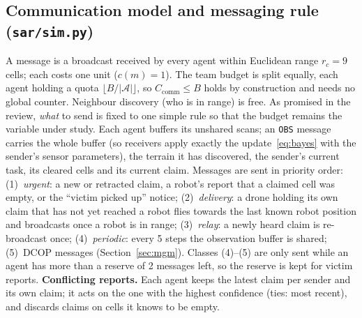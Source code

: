 \documentclass{article}
\newcommand{\A}{\mathscr{A}}
\begin{document}
\subsection{Communication model and messaging rule (\texttt{sar/sim.py})}
A message is a broadcast received by every agent within Euclidean range $r_c=9$ cells; each costs one unit
($c(m)=1$). The team budget is split equally, each agent holding a quota $\lfloor B/|\A|\rfloor$, so
$C_{\mathrm{comm}}\le B$ holds by construction and needs no global counter. Neighbour discovery (who is in range) is free.
As promised in the review, \emph{what} to send is fixed to one simple rule so that the budget remains the variable
under study. Each agent buffers its unshared scans; an \texttt{OBS} message carries the whole buffer (so receivers apply
exactly the update~\eqref{eq:bayes} with the sender's sensor parameters), the terrain it has discovered, the sender's
current task, its cleared cells and its current claim. Messages are sent in priority order: (1)~\emph{urgent}: a new or retracted claim, a robot's
report that a claimed cell was empty, or the ``victim picked up'' notice; (2)~\emph{delivery}: a drone holding its own
claim that has not yet reached a robot flies towards the last known robot position and broadcasts once a robot is in
range; (3)~\emph{relay}: a newly heard claim is re-broadcast once; (4)~\emph{periodic}: every 5 steps the observation
buffer is shared; (5)~DCOP messages (Section~\ref{sec:mgm}). Classes (4)--(5) are only sent while an agent has more
than a reserve of 2 messages left, so the reserve is kept for victim reports.
\textbf{Conflicting reports.} Each agent keeps the latest claim per sender and its own claim; it acts on the one with the
highest confidence (ties: most recent), and discards claims on cells it knows to be empty.
\end{document}
